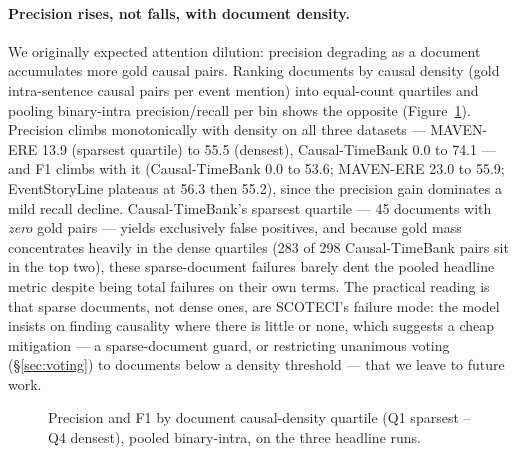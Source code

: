 \documentclass[11pt]{article}
\newcommand{\method}{SCOTECI}
\begin{document}
\paragraph{Precision rises, not falls, with document density.} We originally
expected attention dilution: precision degrading as a document accumulates more
gold causal pairs. Ranking documents by causal density (gold intra-sentence causal
pairs per event mention) into equal-count quartiles and pooling binary-intra
precision/recall per bin shows the opposite (Figure~\ref{fig:density}). Precision
climbs monotonically with density on all three datasets --- MAVEN-ERE 13.9
(sparsest quartile) to 55.5 (densest), Causal-TimeBank 0.0 to 74.1 --- and F1
climbs with it (Causal-TimeBank 0.0 to 53.6; MAVEN-ERE 23.0 to 55.9; EventStoryLine
plateaus at 56.3 then 55.2), since the precision gain dominates a mild recall
decline. Causal-TimeBank's sparsest quartile --- 45 documents with \emph{zero}
gold pairs --- yields exclusively false positives, and because gold mass
concentrates heavily in the dense quartiles (283 of 298 Causal-TimeBank pairs sit
in the top two), these sparse-document failures barely dent the pooled headline
metric despite being total failures on their own terms. The practical reading is
that sparse documents, not dense ones, are \method{}'s failure mode: the model
insists on finding causality where there is little or none, which suggests a
cheap mitigation --- a sparse-document guard, or restricting unanimous voting
(\S\ref{sec:voting}) to documents below a density threshold --- that we leave to
future work.

\begin{figure}[t]
  \centering
  \caption{Precision and F1 by document causal-density quartile (Q1 sparsest --
  Q4 densest), pooled binary-intra, on the three headline runs.}
  \label{fig:density}
\end{figure}
\end{document}
